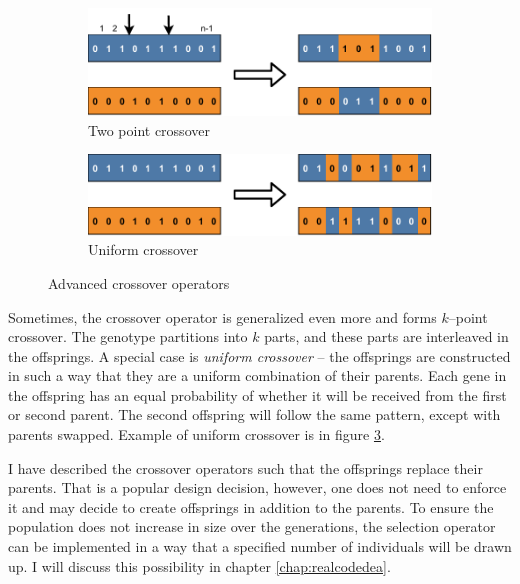 \begin{figure}
    \begin{subfigure}[b]{0.4\textwidth}
        \includegraphics[width=\textwidth]{img/master_twopointcrossover.pdf}
        \caption{Two point crossover}
        \label{fig:gatwopointcrossover}
    \end{subfigure}
    \hfill
    \begin{subfigure}[b]{0.4\textwidth}
        \includegraphics[width=\textwidth]{img/master_uniformcrossover.pdf}
        \caption{Uniform crossover}
        \label{fig:uniformcrossover}
    \end{subfigure}
    \caption{Advanced crossover operators}
\end{figure}

Sometimes, the crossover operator is generalized even more and forms $k$--point crossover. The genotype partitions into $k$ parts, and these parts are interleaved in the offsprings. A special case is \emph{uniform crossover} -- the offsprings are constructed in such a way that they are a uniform combination of their parents. Each gene in the offspring has an equal probability of whether it will be received from the first or second parent. The second offspring will follow the same pattern, except with parents swapped. Example of uniform crossover is in figure \ref{fig:uniformcrossover}.

I have described the crossover operators such that the offsprings replace their parents. That is a popular design decision, however, one does not need to enforce it and may decide to create offsprings in addition to the parents. To ensure the population does not increase in size over the generations, the selection operator can be implemented in a way that a specified number of individuals will be drawn up. I will discuss this possibility in chapter \ref{chap:realcodedea}.

